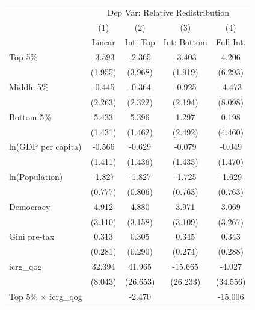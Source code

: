 \begin{tabular}{l*{4}{c}}
\toprule
                    &\multicolumn{4}{c}{Dep Var: Relative Redistribution}\\
                    &\multicolumn{1}{c}{(1)}&\multicolumn{1}{c}{(2)}&\multicolumn{1}{c}{(3)}&\multicolumn{1}{c}{(4)}\\
                    &\multicolumn{1}{c}{Linear}&\multicolumn{1}{c}{Int: Top}&\multicolumn{1}{c}{Int: Bottom}&\multicolumn{1}{c}{Full Int.}\\
\midrule
Top 5\%             &      -3.593&      -2.365&      -3.403&       4.206\\
                    &     (1.955)&     (3.968)&     (1.919)&     (6.293)\\
\addlinespace
Middle 5\%          &      -0.445&      -0.364&      -0.925&      -4.473\\
                    &     (2.263)&     (2.322)&     (2.194)&     (8.098)\\
\addlinespace
Bottom 5\%          &       5.433&       5.396&       1.297&       0.198\\
                    &     (1.431)&     (1.462)&     (2.492)&     (4.460)\\
\addlinespace
ln(GDP per capita)  &      -0.566&      -0.629&      -0.079&      -0.049\\
                    &     (1.411)&     (1.436)&     (1.435)&     (1.470)\\
\addlinespace
ln(Population)      &      -1.827&      -1.827&      -1.725&      -1.629\\
                    &     (0.777)&     (0.806)&     (0.763)&     (0.763)\\
\addlinespace
Democracy           &       4.912&       4.880&       3.971&       3.069\\
                    &     (3.110)&     (3.158)&     (3.109)&     (3.267)\\
\addlinespace
Gini pre-tax        &       0.313&       0.305&       0.345&       0.343\\
                    &     (0.281)&     (0.290)&     (0.274)&     (0.288)\\
\addlinespace
icrg\_qog            &      32.394&      41.965&     -15.665&      -4.027\\
                    &     (8.043)&    (26.653)&    (26.233)&    (34.556)\\
\addlinespace
Top 5\% $\times$ icrg\_qog&            &      -2.470&            &     -15.006\\

\end{tabular}
